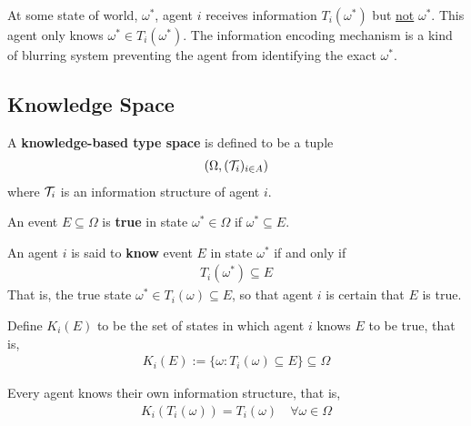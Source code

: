 \documentclass{article}
\begin{document}
    \begin{remark}[Interpretation]
    	At some state of world, $\omega^*$, agent $i$ receives information $T_i(\omega^*)$ but \ul{not} $\omega^*$. This agent only knows $\omega^* \in T_i(\omega^*)$. The information encoding mechanism is a kind of blurring system preventing the agent from identifying the exact $\omega^*$.
    \end{remark}
    
    \subsection{Knowledge Space}
    \begin{definition}
    	A \textbf{knowledge-based type space} is defined to be a tuple
    	\begin{align}
    		(\Omega, (\mathcal{{T}}_i)_{i \in A})
    	\end{align}
    	where $\mathcal{{T}}_i$ is an information structure of agent $i$.
    \end{definition}
    
    \begin{definition}
    	An event $E \subseteq \Omega$ is \textbf{true} in state $\omega^* \in \Omega$ if $\omega^* \subseteq E$. 
    \end{definition}
   
   	\begin{definition}
   		An agent $i$ is said to \textbf{know} event $E$ in state $\omega^*$ if and only if
   		\begin{align}
   			T_i(\omega^*) \subseteq E
   		\end{align}
   		That is, the true state $\omega^* \in T_i(\omega) \subseteq E$, so that agent $i$ is certain that $E$ is true.
   	\end{definition}
   	
   	\begin{definition}
   		Define $K_i(E)$ to be the set of states in which agent $i$ knows $E$ to be true, that is,
   		\begin{align}
   			K_i(E) := \{\omega: T_i(\omega) \subseteq E\} \subseteq \Omega
   		\end{align}
   	\end{definition}
   	
   	\begin{theorem}
   		Every agent knows their own information structure, that is,
   		\begin{align}
   			K_i (T_i(\omega)) = T_i(\omega)\quad \forall \omega \in \Omega
   		\end{align}
   	\end{theorem}
   	
\end{document}
